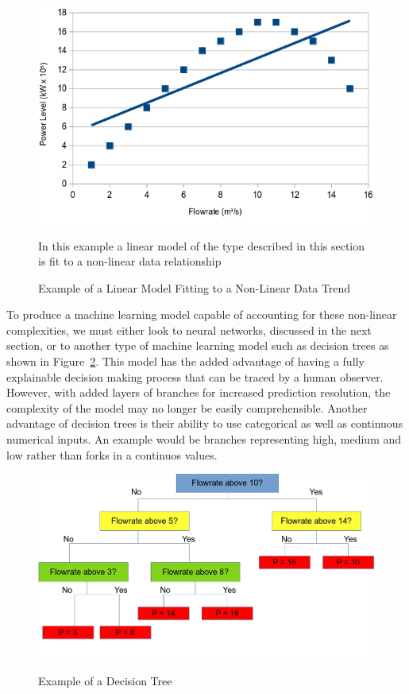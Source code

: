 \begin{figure}[h]
	\centering
	\includegraphics[scale=0.45]{Figures/LinearFit.jpg}
	\caption{Example of a Linear Model Fitting to a Non-Linear Data Trend} {In this example a linear model of the type described in this section is fit to a non-linear data relationship}
	\label{fig:linearFit}
\end{figure}

 
 \noindent
 To produce a machine learning model capable of accounting for these non-linear complexities, we must either look to neural networks, discussed in the next section, or to another type of machine learning model such as decision trees \cite{de2013decision} as shown in Figure~\ref{fig:DecisionTree}. This model has the added advantage of having a fully explainable decision making process that can be traced by a human observer. However, with added layers of branches for increased prediction resolution, the complexity of the model may no longer be easily comprehensible. Another advantage of decision trees is their ability to use categorical as well as continuous numerical inputs. An example would be branches representing high, medium and low rather than forks in a continuos values.
 
 \begin{figure}[h]
 	\centering
 	\includegraphics[scale=0.4]{Figures/DecisionTree.jpg}
 	\caption{Example of a Decision Tree} {}
 	\label{fig:DecisionTree}
 \end{figure}


